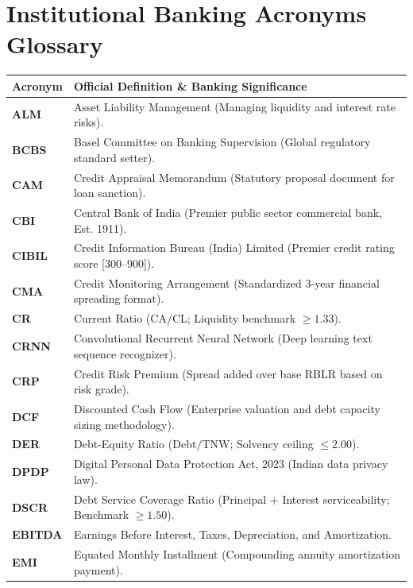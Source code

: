 \documentclass[11pt,a4paper,oneside]{report}
\begin{document}
\chapter*{Institutional Banking Acronyms Glossary}
\begin{longtable}{p{} p{}}
\toprule
\textbf{Acronym} & \textbf{Official Definition \& Banking Significance} \\
\midrule
\endhead
\textbf{ALM} & Asset Liability Management (Managing liquidity and interest rate risks). \\
\textbf{BCBS} & Basel Committee on Banking Supervision (Global regulatory standard setter). \\
\textbf{CAM} & Credit Appraisal Memorandum (Statutory proposal document for loan sanction). \\
\textbf{CBI} & Central Bank of India (Premier public sector commercial bank, Est. 1911). \\
\textbf{CIBIL} & Credit Information Bureau (India) Limited (Premier credit rating score [300--900]). \\
\textbf{CMA} & Credit Monitoring Arrangement (Standardized 3-year financial spreading format). \\
\textbf{CR} & Current Ratio ($\text{CA} / \text{CL}$; Liquidity benchmark $\ge 1.33$). \\
\textbf{CRNN} & Convolutional Recurrent Neural Network (Deep learning text sequence recognizer). \\
\textbf{CRP} & Credit Risk Premium (Spread added over base RBLR based on risk grade). \\
\textbf{DCF} & Discounted Cash Flow (Enterprise valuation and debt capacity sizing methodology). \\
\textbf{DER} & Debt-Equity Ratio ($\text{Debt} / \text{TNW}$; Solvency ceiling $\le 2.00$). \\
\textbf{DPDP} & Digital Personal Data Protection Act, 2023 (Indian data privacy law). \\
\textbf{DSCR} & Debt Service Coverage Ratio (Principal + Interest serviceability; Benchmark $\ge 1.50$). \\
\textbf{EBITDA} & Earnings Before Interest, Taxes, Depreciation, and Amortization. \\
\textbf{EMI} & Equated Monthly Installment (Compounding annuity amortization payment). \\

\end{longtable}
\end{document}
